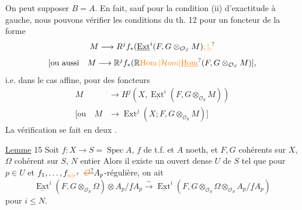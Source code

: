 On peut supposer $B=A$.
En fait, sauf pour la condition (ii) d'exactitude à gauche, nous pouvons vérifier les conditions du th. 12  pour un foncteur de la forme
\[
 M\longrightarrow R^{j}f_*(\underline{\operatorname{Ext}}^{i}(F,G\otimes_{\mathcal O_S}M)\unsure{;|,}
\]
\[
 [\text{ou aussi}\quad M\longrightarrow\mathbb R^{j}f_*(\mathbb R\unsure{\operatorname{Hom}|\mathcal Hom|\underline{\operatorname{Hom}}}(F,G\otimes_{\mathcal O_S}M)],
\]
i.e. dans le cas affine, pour des foncteurs
\[
 \begin{aligned}
 M&\longrightarrow H^j(X,\underline{\operatorname{Ext}}^i(F,G\otimes_{\mathcal O_S}M))\\
 {}[\text{ou}\quad M&\longrightarrow \operatorname{Ext}^j(X; F,G\otimes_{\mathcal O_S}M)]
 \end{aligned}
\]
La vérification se fait en deux .

\uline{Lemme} 15 Soit $f:X\longrightarrow S=\operatorname{Spec}A$, $f$ de t.f. et $A$ noeth, et $F,G$  cohérents sur $X$, $\Omega$ cohérent sur $S$, $N$ entier Alors il existe un ouvert dense $U$ de $S$ tel que pour $p\in U$ et $f_1,\ldots,f_{\unsure{n|r}}$   $\deleted{\unsure{\mathcal O}}A_p$-régulière, on ait
\[
 \underline{\operatorname{Ext}}^i(F,G\otimes_{\mathcal O_S}\Omega)\otimes A_p/\underline f A_p
 \overset{\sim}{\longrightarrow}\underline{\operatorname{Ext}}^i(F,G\otimes_{\mathcal O_S}\Omega\otimes_{\mathcal O_S}A_p/\underline f A_p)
\]
pour $i\leq N$.

